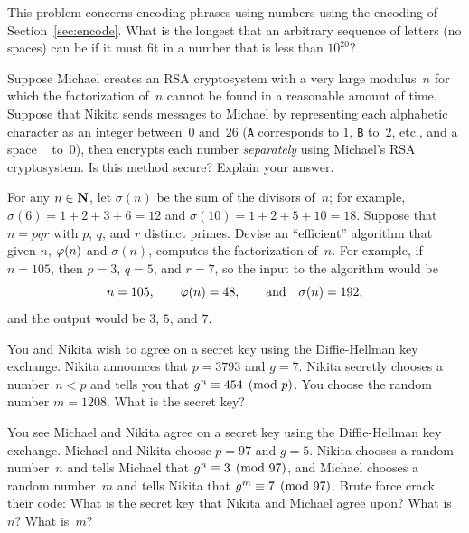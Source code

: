 \begin{exercises}

\item\label{ex:crypto2}  This problem concerns encoding phrases
using numbers using the encoding of Section~\ref{sec:encode}.
What is the longest that an arbitrary sequence of letters (no spaces)
can be if it must fit in a number that is less than $10^{20}$?

\item \label{ex:crypto6}
Suppose Michael creates an RSA cryptosystem with a very large
modulus~$n$ for which the factorization of~$n$ cannot be found
in a reasonable amount of time. Suppose that Nikita sends
messages to Michael by representing each alphabetic character
as an integer between~$0$ and~$26$ (\verb*|A| corresponds
to $1$, \verb*|B| to~$2$, etc., and a space \verb*| | to~$0$),
then encrypts each number {\em separately}
using Michael's RSA cryptosystem.  Is this method secure?
Explain your answer.



\item\label{ex:crack3}
   For any $n\in\mathbf{N}$, let $\sigma(n)$ be the
  sum of the divisors of~$n$; for example, $\sigma(6) = 1+2+3+6=12$ and
  $\sigma(10)=1+2+5+10=18$.
  Suppose that $n=pqr$ with $p$, $q$, and $r$ distinct primes.  Devise
  an ``efficient'' algorithm that given $n$, $\varphi(n)$ and
  $\sigma(n)$, computes the factorization of~$n$.  For example, if
  $n=105$, then $p=3$, $q=5$, and $r=7$, so the input to the algorithm
  would be
  $$
    n = 105,\qquad \varphi(n) = 48, \qquad \text{and}\quad \sigma(n)=192,
  $$
  and the output would be $3$, $5$, and $7$.


\item\label{ex:crypto1}  You and Nikita wish to agree on a secret key using
the Diffie-Hellman key exchange.  Nikita announces that $p=3793$ and
$g=7$.  Nikita secretly chooses a number~$n<p$ and tells you
that $g^n\equiv 454\pmod{p}$.  You choose the random number
$m=1208$.  What is the secret key?

\item\label{ex:crypto3} You see Michael and Nikita agree on a secret
  key using the Diffie-Hellman key exchange.  Michael and Nikita
  choose $p=97$ and $g=5$.  Nikita chooses a random number~$n$ and
  tells Michael that $g^n\equiv 3\pmod{97}$, and Michael chooses a
  random number~$m$ and tells Nikita that $g^m\equiv 7\pmod{97}$.  Brute
  force crack their code: What is the secret key that Nikita and
  Michael agree upon?  What is~$n$?  What is~$m$?


\end{exercises}
